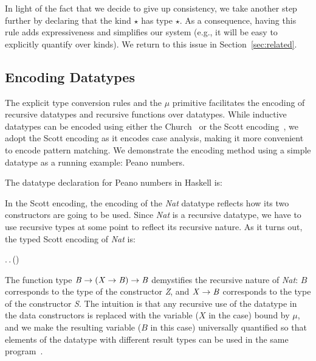 In light of the fact that we decide to give up consistency, we take
another step further by declaring that the kind $\star$ has type
$\star$. As a consequence, having this rule adds expressiveness and
simplifies our system (e.g., it will be easy to explicitly quantify
over kinds). We return to this issue in Section~\ref{sec:related}.


\subsection{Encoding Datatypes}

The explicit type conversion rules and the $\mu$ primitive facilitates
the encoding of recursive datatypes and recursive functions over
datatypes. While inductive datatypes can be encoded using either the
Church~\cite{tapl} or the Scott encoding~\cite{encoding:scott}, we
adopt the Scott encoding as it encodes case analysis, making it more
convenient to encode pattern matching. We demonstrate the encoding
method using a simple datatype as a running example: Peano numbers.

The datatype declaration for Peano numbers in Haskell is:
\begin{hscode}\SaveRestoreHook
{}%
%
%
\>[4]{}\;\mathrel{=}\mid {}\;\<[E]%
\ColumnHook
\end{hscode}\resethooks
In the Scott encoding, the encoding of the \emph{Nat} datatype
reflects how its two constructors are going to be used. Since
\emph{Nat} is a recursive datatype, we have to use recursive types at
some point to reflect its recursive nature. As it turns out, the typed
Scott encoding of \emph{Nat} is:
\begin{hscode}\SaveRestoreHook
{}%
%
%
\>[3]{}\mu\;\mathbin{:}\star.\,\Pi\;\mathbin{:}\star.\,\to (\to {})\to {}\<[E]%
\ColumnHook
\end{hscode}\resethooks
The function type \ensuremath{\Conid{B}\to (\Conid{X}\to \Conid{B})\to \Conid{B}} demystifies the recursive
nature of \emph{Nat}: $B$ corresponds to the type of the constructor
\emph{Z}, and \ensuremath{\Conid{X}\to \Conid{B}} corresponds to the type of the constructor
\emph{S}. The intuition is that any recursive use of the datatype in
the data constructors is replaced with the variable ($X$ in the case)
bound by $\mu$, and we make the resulting variable ($B$ in this case)
universally quantified so that elements of the datatype with different
result types can be used in the same program~\cite{gadts}.


